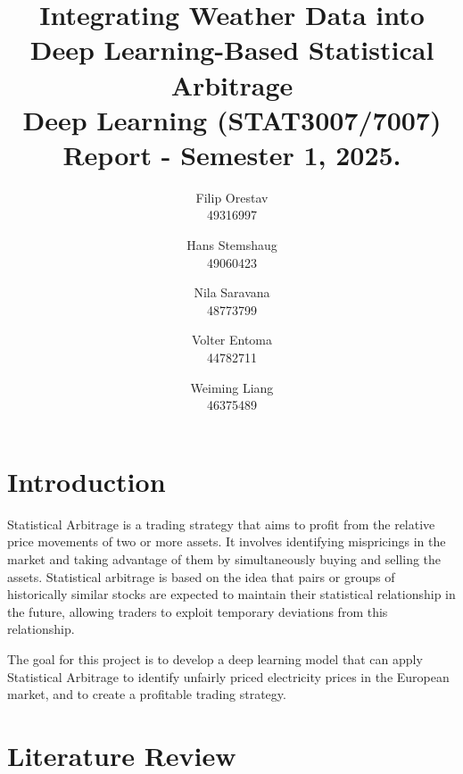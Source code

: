 \documentclass[12pt]{article}
\title{Integrating Weather Data into Deep Learning-Based Statistical Arbitrage \\ Deep Learning (STAT3007/7007) \\ Report - Semester 1, 2025.}
\author{\normalsize
    Filip Orestav\\ \normalsize
    49316997
    \and \normalsize
    Hans Stemshaug\\ \normalsize
    49060423
    \and \normalsize
    Nila Saravana\\ \normalsize
    48773799
    \and \normalsize
    Volter Entoma\\ \normalsize
    44782711
    \and \normalsize
    Weiming Liang\\ \normalsize
    46375489
}
\begin{document}
\maketitle




\section{Introduction}

Statistical Arbitrage is a trading strategy that aims to profit from the relative price movements of two or more assets.  It involves identifying mispricings in the market and taking advantage of them by simultaneously buying and selling the assets. Statistical arbitrage is based on the idea that pairs or groups of historically similar stocks are expected to maintain their statistical relationship in the future, allowing traders to exploit temporary deviations from this relationship. \citep{avellaneda2010statistical}

The goal for this project is to develop a deep learning model that can apply Statistical Arbitrage to identify unfairly priced electricity prices in the European market, and to create a profitable trading strategy.

\clearpage




\section{Literature Review}

\citep{guijarro2021deep}
\end{document}
